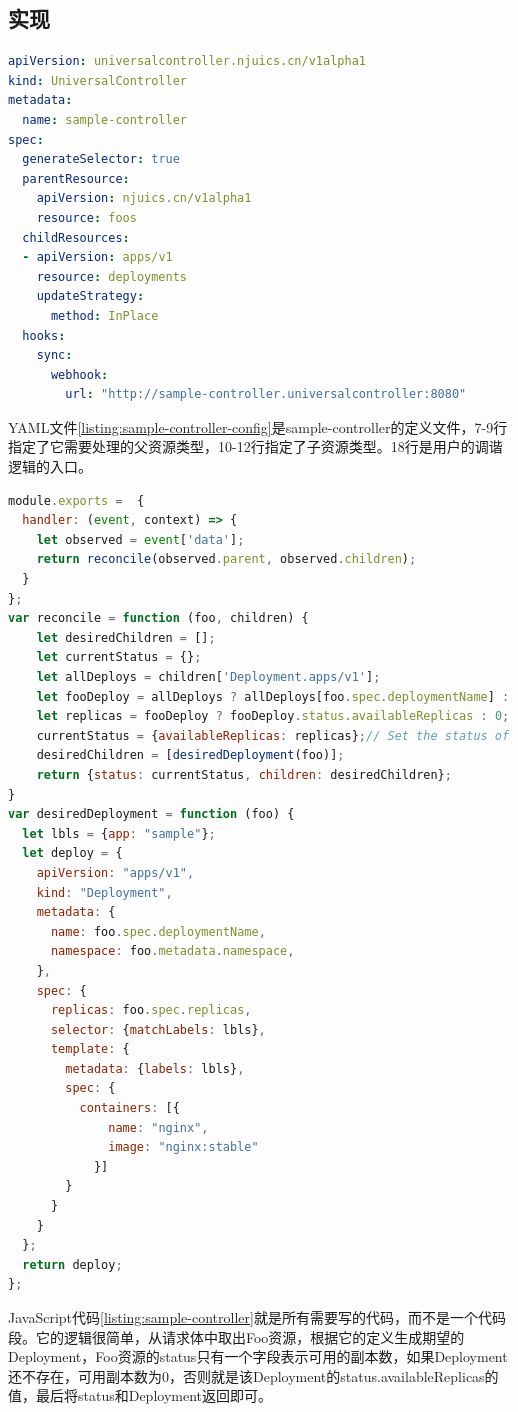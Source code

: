 \documentclass[macfonts,master]{njuthesis}
\begin{document}
\subsection{实现}

\begin{lstlisting}[language=yaml,caption=sample-controller的配置文件,label=listing:sample-controller-config]
apiVersion: universalcontroller.njuics.cn/v1alpha1
kind: UniversalController
metadata:
  name: sample-controller
spec:
  generateSelector: true
  parentResource:
    apiVersion: njuics.cn/v1alpha1
    resource: foos
  childResources:
  - apiVersion: apps/v1
    resource: deployments
    updateStrategy:
      method: InPlace
  hooks:
    sync:
      webhook:
        url: "http://sample-controller.universalcontroller:8080"
\end{lstlisting}

YAML文件\ref{listing:sample-controller-config}是sample-controller的定义文件，7-9行指定了它需要处理的父资源类型，10-12行指定了子资源类型。18行是用户的调谐逻辑的入口。


\begin{lstlisting}[language=JavaScript,caption=sample-controller的实现代码,label=listing:sample-controller]
module.exports =  {
  handler: (event, context) => {
    let observed = event['data'];
    return reconcile(observed.parent, observed.children);
  }
};
var reconcile = function (foo, children) {
    let desiredChildren = [];
    let currentStatus = {};
    let allDeploys = children['Deployment.apps/v1'];
    let fooDeploy = allDeploys ? allDeploys[foo.spec.deploymentName] : null;
    let replicas = fooDeploy ? fooDeploy.status.availableReplicas : 0;
    currentStatus = {availableReplicas: replicas};// Set the status of Foo
    desiredChildren = [desiredDeployment(foo)];
    return {status: currentStatus, children: desiredChildren};
}
var desiredDeployment = function (foo) {
  let lbls = {app: "sample"};
  let deploy = {
    apiVersion: "apps/v1",
    kind: "Deployment",
    metadata: {
      name: foo.spec.deploymentName,
      namespace: foo.metadata.namespace,
    },
    spec: {
      replicas: foo.spec.replicas,
      selector: {matchLabels: lbls},
      template: {
        metadata: {labels: lbls},
        spec: {
          containers: [{
              name: "nginx",
              image: "nginx:stable"
            }]
        }
      }
    }
  };
  return deploy;
};
\end{lstlisting}

JavaScript代码\ref{listing:sample-controller}就是所有需要写的代码，而不是一个代码段。它的逻辑很简单，从请求体中取出Foo资源，根据它的定义生成期望的Deployment，Foo资源的status只有一个字段表示可用的副本数，如果Deployment还不存在，可用副本数为0，否则就是该Deployment的status.availableReplicas的值，最后将status和Deployment返回即可。
\end{document}
